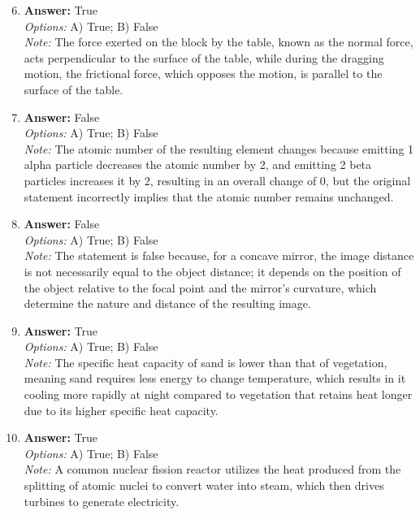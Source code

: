 \documentclass[12pt]{article}
\begin{document}
\begin{enumerate}[label=\arabic*.]
\setcounter{enumi}{5}
\item \textbf{Answer:} True
\\ \textit{Options:} A) True; B) False
\\ \textit{Note:} The force exerted on the block by the table, known as the normal force, acts perpendicular to the surface of the table, while during the dragging motion, the frictional force, which opposes the motion, is parallel to the surface of the table.
\item \textbf{Answer:} False
\\ \textit{Options:} A) True; B) False
\\ \textit{Note:} The atomic number of the resulting element changes because emitting 1 alpha particle decreases the atomic number by 2, and emitting 2 beta particles increases it by 2, resulting in an overall change of 0, but the original statement incorrectly implies that the atomic number remains unchanged.
\item \textbf{Answer:} False
\\ \textit{Options:} A) True; B) False
\\ \textit{Note:} The statement is false because, for a concave mirror, the image distance is not necessarily equal to the object distance; it depends on the position of the object relative to the focal point and the mirror's curvature, which determine the nature and distance of the resulting image.
\item \textbf{Answer:} True
\\ \textit{Options:} A) True; B) False
\\ \textit{Note:} The specific heat capacity of sand is lower than that of vegetation, meaning sand requires less energy to change temperature, which results in it cooling more rapidly at night compared to vegetation that retains heat longer due to its higher specific heat capacity.
\item \textbf{Answer:} True
\\ \textit{Options:} A) True; B) False
\\ \textit{Note:} A common nuclear fission reactor utilizes the heat produced from the splitting of atomic nuclei to convert water into steam, which then drives turbines to generate electricity.
\end{enumerate}
\end{document}
